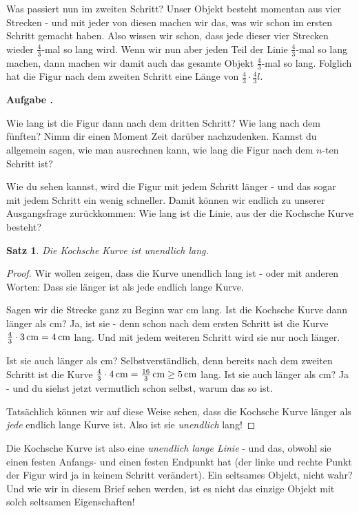 \documentclass[a4paper,ngerman,12pt]{scrartcl}
\theoremstyle{definition}
\theoremstyle{plain}
\newtheorem{satz}[defn]{Satz}
\theoremstyle{remark}
\newlength{\aufgabenskip}
\newcounter{aufgabennummer}
\newenvironment{aufgabe}[1]{
  \addtocounter{aufgabennummer}{1}
  \textbf{Aufgabe \theaufgabennummer.} \emph{#1} \par
}{\vspace{\aufgabenskip}}
\begin{document}
Was passiert nun im zweiten Schritt? Unser Objekt besteht momentan aus vier Strecken - und mit jeder von diesen machen wir das, was wir schon im ersten Schritt gemacht haben. Also wissen wir schon, dass jede dieser vier Strecken wieder $\frac{4}{3}$-mal so lang wird. Wenn wir nun aber jeden Teil der Linie $\frac{4}{3}$-mal so lang machen, dann machen wir damit auch das gesamte Objekt $\frac{4}{3}$-mal so lang. Folglich hat die Figur nach dem zweiten Schritt eine Länge von $\frac{4}{3}\cdot\frac{4}{3}l$. 

\begin{aufgabe}{}
	Wie lang ist die Figur dann nach dem dritten Schritt? Wie lang nach dem fünften? Nimm dir einen Moment Zeit darüber nachzudenken. Kannst du allgemein sagen, wie man ausrechnen kann, wie lang die Figur nach dem $n$-ten Schritt ist? 
\end{aufgabe}

Wie du sehen kannst, wird die Figur mit jedem Schritt länger - und das sogar mit jedem Schritt ein wenig schneller. Damit können wir endlich zu unserer Ausgangsfrage zurückkommen: Wie lang ist die Linie, aus der die Kochsche Kurve besteht?

\begin{satz}\label{satz:Kochkurve_laenge}
Die Kochsche Kurve ist unendlich lang.
\end{satz} 

\begin{proof}
Wir wollen zeigen, dass die Kurve unendlich lang ist - oder mit anderen Worten: Dass sie länger ist als jede endlich lange Kurve.

Sagen wir die Strecke ganz zu Beginn war \unit[3]{cm} lang. Ist die Kochsche Kurve dann länger als \unit[4]{cm}? Ja, ist sie - denn schon nach dem ersten Schritt ist die Kurve $\frac{4}{3}\cdot\unit[3]{cm} = \unit[4]{cm}$ lang. Und mit jedem weiteren Schritt wird sie nur noch länger. 

Ist sie auch länger als \unit[5]{cm}? Selbstverständlich, denn bereits nach dem zweiten Schritt ist die Kurve $\frac{4}{3}\cdot\unit[4]{cm} = \unit[\frac{16}{3}]{cm}\geq  \unit[5]{cm}$ lang. Ist sie auch länger als \unit[6]{cm}? Ja - und du siehst jetzt vermutlich schon selbst, warum das so ist. 

Tatsächlich können wir auf diese Weise sehen, dass die Kochsche Kurve länger als \emph{jede} endlich lange Kurve ist. Also ist sie \emph{unendlich} lang!
\end{proof}

Die Kochsche Kurve ist also eine \emph{unendlich lange Linie} - und das, obwohl sie einen festen Anfangs- und einen festen Endpunkt hat (der linke und rechte Punkt der Figur wird ja in keinem Schritt verändert). Ein seltsames Objekt, nicht wahr? Und wie wir in diesem Brief sehen werden, ist es nicht das einzige Objekt mit solch seltsamen Eigenschaften!
\end{document}
